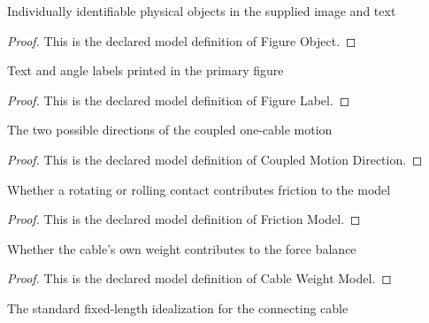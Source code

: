 \begin{definition}
  \label{def:physics:phyx-mini-0800:phyxminiproblems-problemphyxmini0800-figureobject}
  Individually identifiable physical objects in the supplied image and text
\end{definition}
\begin{proof}
  This is the declared model definition of Figure Object.
\end{proof}
\begin{definition}
  \label{def:physics:phyx-mini-0800:phyxminiproblems-problemphyxmini0800-figurelabel}
  Text and angle labels printed in the primary figure
\end{definition}
\begin{proof}
  This is the declared model definition of Figure Label.
\end{proof}
\begin{definition}
  \label{def:physics:phyx-mini-0800:phyxminiproblems-problemphyxmini0800-coupledmotiondirection}
  The two possible directions of the coupled one-cable motion
\end{definition}
\begin{proof}
  This is the declared model definition of Coupled Motion Direction.
\end{proof}
\begin{definition}
  \label{def:physics:phyx-mini-0800:phyxminiproblems-problemphyxmini0800-frictionmodel}
  Whether a rotating or rolling contact contributes friction to the model
\end{definition}
\begin{proof}
  This is the declared model definition of Friction Model.
\end{proof}
\begin{definition}
  \label{def:physics:phyx-mini-0800:phyxminiproblems-problemphyxmini0800-cableweightmodel}
  Whether the cable's own weight contributes to the force balance
\end{definition}
\begin{proof}
  This is the declared model definition of Cable Weight Model.
\end{proof}
\begin{definition}
  \label{def:physics:phyx-mini-0800:phyxminiproblems-problemphyxmini0800-cableextensionmodel}
  The standard fixed-length idealization for the connecting cable
\end{definition}
